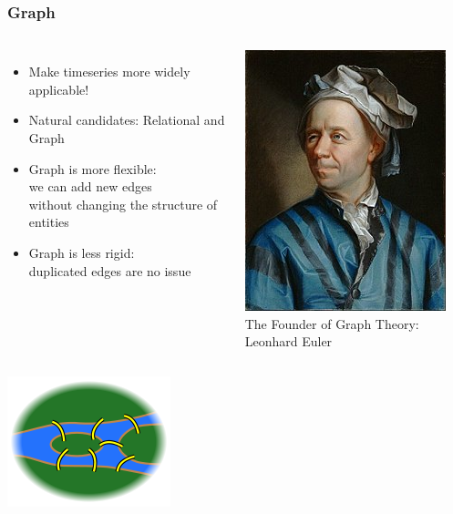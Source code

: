 \documentclass[mathserif,usenames,dvipsnames]{beamer}
\begin{document}
\begin{frame}
\frametitle{Graph}
\begin{columns}[T]
\begin{itemize}
\item Make timeseries more widely applicable!
\item Natural candidates: Relational and Graph
\item Graph is more flexible:\\
      we can add new edges \\
      without changing the structure of entities
\item Graph is less rigid:\\
      duplicated edges are no issue
\end{itemize}
\begin{center}
\vskip-0.4cm
\linewidth
\includegraphics[width=0.75\linewidth]{../img/leoeuler.jpg}\\
\vskip-0.2cm
\hskip-1.2cm
{\tiny The Founder of Graph Theory:}
\vskip-0.2cm
\hskip-1.2cm
{\tiny Leonhard Euler}
\end{center}
\end{columns}
\begin{center}
\includegraphics[width=0.25\linewidth]{../img/bridges1.png}

\end{center}
\end{frame}
\end{document}
